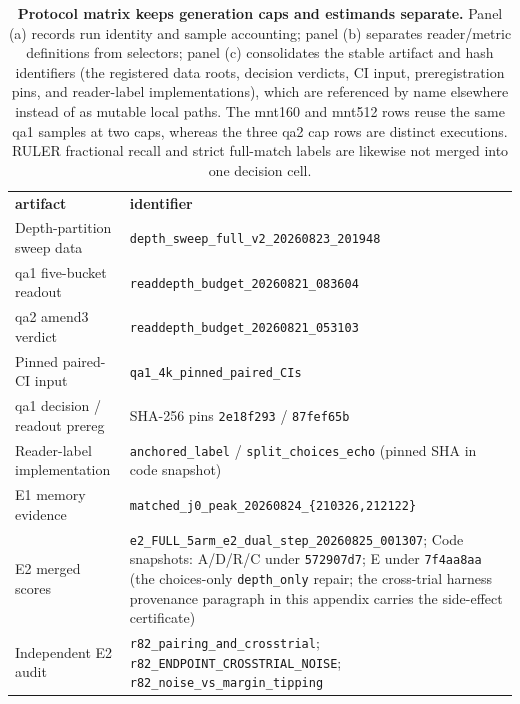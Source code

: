 \begin{table}[htbp]
\vspace{0.6em}
\begin{tabularx}{\textwidth}{@{}>{\raggedright\arraybackslash}p{}
>{\raggedright\arraybackslash}X@{}}
\toprule
\multicolumn{2}{@{}l}{\textbf{(c) Artifact and pin identifiers (stable hashes)}} \\
\midrule
\textbf{artifact} & \textbf{identifier} \\
\midrule
Depth-partition sweep data & \texttt{depth\_sweep\_full\_v2\_20260823\_201948} \\
qa1 five-bucket readout & \texttt{readdepth\_budget\_20260821\_083604} \\
qa2 amend3 verdict & \texttt{readdepth\_budget\_20260821\_053103} \\
Pinned paired-CI input & \texttt{qa1\_4k\_pinned\_paired\_CIs} \\
qa1 decision / readout prereg & SHA-256 pins \texttt{2e18f293} / \texttt{87fef65b} \\
Reader-label implementation & \texttt{anchored\_label} / \texttt{split\_choices\_echo} (pinned SHA in code snapshot) \\
E1 memory evidence & \texttt{matched\_j0\_peak\_20260824\_\{210326,212122\}} \\
E2 merged scores & \texttt{e2\_FULL\_5arm\_e2\_dual\_step\_20260825\_001307}; Code snapshots: A/D/R/C under \texttt{572907d7}; E under \texttt{7f4aa8aa} (the choices-only \texttt{depth\_only} repair; the cross-trial harness provenance
paragraph in this appendix carries the side-effect certificate) \\
Independent E2 audit & \texttt{r82\_pairing\_and\_crosstrial}; \texttt{r82\_ENDPOINT\_CROSSTRIAL\_NOISE}; \texttt{r82\_noise\_vs\_margin\_tipping} \\
\bottomrule
\end{tabularx}
\caption{\textbf{Protocol matrix keeps generation caps and estimands
separate.}  Panel (a) records run identity and sample accounting; panel (b)
separates reader/metric definitions from selectors; panel (c) consolidates the
stable artifact and hash identifiers (the registered data roots, decision
verdicts, CI input, preregistration pins, and reader-label implementations),
which are referenced by name elsewhere instead of as mutable local paths.
The mnt160 and mnt512 rows reuse the same qa1 samples at two caps, whereas the
three qa2 cap rows are distinct executions.  RULER fractional recall and
strict full-match labels are likewise not merged into one \mbox{decision} cell.}
\label{tab:protocol-matrix}
\end{table}

